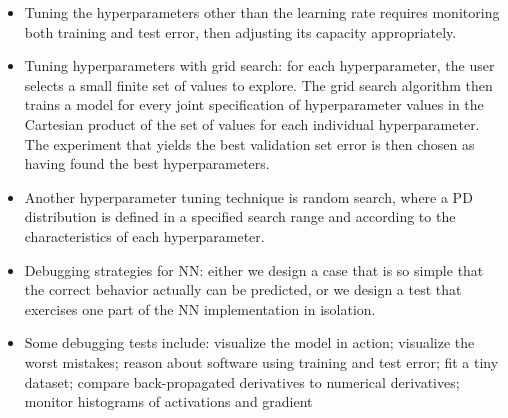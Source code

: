 \documentclass{article}
\begin{document}
\begin{itemize}
\item Tuning the hyperparameters other than the learning rate requires monitoring both training and test error, then adjusting its capacity appropriately.
\item Tuning hyperparameters with grid search: for each hyperparameter, the user selects a small finite set of values to explore. The grid search algorithm then trains a model for every joint specification of hyperparameter values in the Cartesian product of the set of values for each individual hyperparameter. The experiment that yields the best validation set error is then chosen as having found the best hyperparameters.
\item Another hyperparameter tuning technique is random search, where a PD distribution is defined in a specified search range and according to the characteristics of each hyperparameter.
\item Debugging strategies for NN: either we design a case that is so simple that the correct behavior actually can be predicted, or we design a test that exercises one part of the NN implementation in isolation.
\item Some debugging tests include: visualize the model in action; visualize the worst mistakes; reason about software using training and test error; fit a tiny dataset; compare back-propagated derivatives to numerical derivatives; monitor histograms of activations and gradient
\end{itemize}
\end{document}
